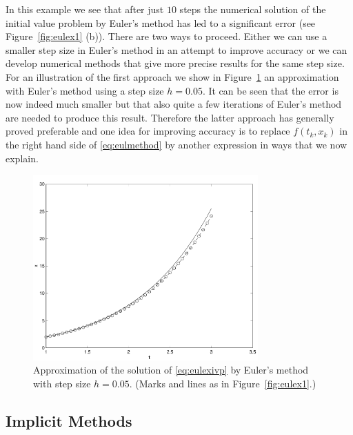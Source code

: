 \documentclass{ximera}
\begin{document}
In this example we see that after just $10$ steps the numerical solution 
of the initial value problem 
by Euler's method has led to a significant 
error (see Figure~\ref{fig:eulex1} (b)).  There are two ways to proceed.
Either we can use a smaller step size in 
Euler's method in an attempt to 
improve accuracy or we can develop numerical methods that give more 
precise results for the same step size. For an illustration of the
first approach we show in Figure~\ref{fig:eulimpr}
an approximation with Euler's method using a step size
$h=0.05$.  It can be seen that the error is now indeed much smaller
but that also quite a few iterations of Euler's method are needed 
to produce this result.  Therefore the latter approach has 
generally proved preferable and one idea for improving accuracy is 
to replace $f(t_k,x_k)$ in the right hand side of 
\eqref{eq:eulmethod} by another expression in ways that we now explain.
\begin{figure}[htb]
   \centerline{%
   \includegraphics[width=3.4in]{../figures/eulimpr.pdf}}
   \caption{Approximation of the solution of
   \protect\eqref{eq:eulexivp} by Euler's method with step size
   $h=0.05$.  (Marks and lines as in Figure~\protect\ref{fig:eulex1}.)}
   \label{fig:eulimpr}
\end{figure}


\subsection*{Implicit Methods}  
\end{document}

